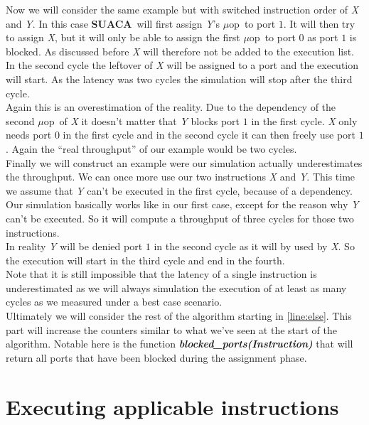 \documentclass[a4paper,12pt,titlepage, twoside]{report}
\newcommand{\suaca}{\textbf{SUACA}}
\newcommand{\microop}{$\mu$op}
\begin{document}
Now we will consider the same example but with switched instruction order of \emph{X} and \emph{Y}. In this case \suaca\ will first assign \emph{Y}'s \microop\ to port $1$. It will then try to assign \emph{X}, but it will only be able to assign the first \microop\ to port $0$ as port $1$ is blocked. As discussed before \emph{X} will therefore not be added to the execution list. In the second cycle the leftover of \emph{X} will be assigned to a port and the execution will start. As the latency was two cycles the simulation will stop after the third cycle.\\
Again this is an overestimation of the reality. Due to the dependency of the second \microop\ of \emph{X} it doesn't matter that \emph{Y} blocks port $1$ in the first cycle. \emph{X} only needs port $0$ in the first cycle and in the second cycle it can then freely use port $1$. Again the ``real throughput'' of our example would be two cycles.\\

Finally we will construct an example were our simulation actually underestimates the throughput. We can once more use our two instructions \emph{X} and \emph{Y}. This time we assume that \emph{Y} can't be executed in the first cycle, because of a dependency. Our simulation basically works like in our first case, except for the reason why \emph{Y} can't be executed. So it will compute a throughput of three cycles for those two instructions.\\
In reality \emph{Y} will be denied port $1$ in the second cycle as it will by used by \emph{X}. So the execution will start in the third cycle and end in the fourth.\\

Note that it is still impossible that the latency of a single instruction is underestimated as we will always simulation the execution of at least as many cycles as we measured under a best case scenario.\\

Ultimately we will consider the rest of the algorithm starting in \autoref{line:else}. This part will increase the counters similar to what we've seen at the start of the algorithm. Notable here is the function \textbf{\emph{blocked\_ports(Instruction)}} that will return all ports that have been blocked during the assignment phase.



\section{Executing applicable instructions}
\label{sec:execute}
\end{document}
